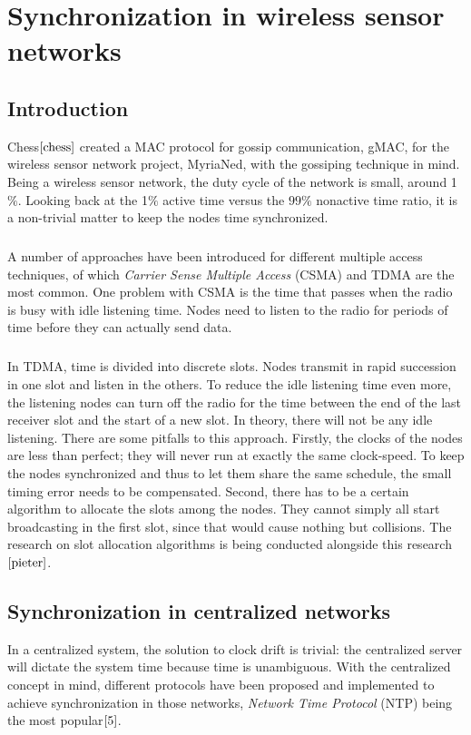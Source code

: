 \documentclass[a4paper,10pt]{report}
\begin{document}
\chapter{\textbf{Synchronization in wireless sensor networks}}
\section{\textbf{Introduction}}
Chess$\cite{chess}$ created a MAC protocol for gossip communication, gMAC, for the wireless sensor network project, MyriaNed, with the gossiping technique in mind. Being a wireless sensor network, the duty cycle of the network is small, around 1$\%$. Looking back at the 1$\%$ active time versus the $99\%$ nonactive time ratio, it is a non-trivial matter to keep the nodes time synchronized.
\paragraph*{}
A number of approaches have been introduced for different multiple access techniques, of which \textit{Carrier Sense Multiple Access} (CSMA) and TDMA are the most common. One problem with CSMA is the time that passes when the radio is busy with idle listening time. Nodes need to listen to the radio for periods of time before they can actually send data.
\paragraph*{}
In TDMA, time is divided into discrete slots. Nodes transmit in rapid succession in one slot and listen in the others. To
reduce the idle listening time even more, the listening nodes can turn off the radio for the time between the end of the last receiver slot and the start of a new slot. In theory, there will not be any idle listening. There are some pitfalls to this approach. Firstly, the clocks of the nodes are less than perfect; they will never run at exactly the same clock-speed. To keep the nodes synchronized and
thus to let them share the same schedule, the small timing error needs to be compensated. Second, there has to be a certain algorithm
to allocate the slots among the nodes. They cannot simply all start broadcasting in the first slot, since that would cause nothing but
collisions. The research on slot allocation algorithms is being conducted alongside this research$\cite{pieter}$.
\section{\textbf{Synchronization in centralized networks}}
In a centralized system, the solution to clock drift is trivial: the centralized server will dictate the system time because time is unambiguous. With the centralized concept in mind, different protocols have been proposed and implemented to achieve synchronization in those networks, \textit{Network Time Protocol} (NTP) being the most popular$\cite{5}$.
\end{document}
